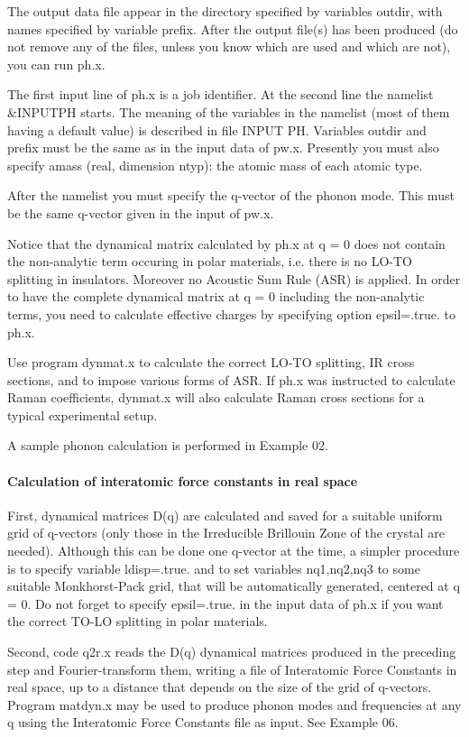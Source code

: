 \documentclass[12pt,a4paper]{article}
\begin{document}
The output data file appear in the directory specified by variables outdir,
with names specified by variable prefix. After the output file(s) has been
produced (do not remove any of the files, unless you know which are used
and which are not), you can run ph.x.
    
The first input line of ph.x is a job identifier. At the second line the
namelist \&INPUTPH starts. The meaning of the variables in the namelist
(most of them having a default value) is described in file INPUT PH. Variables
outdir and prefix must be the same as in the input data of pw.x. Presently
you must also specify amass (real, dimension ntyp): the atomic mass of each
atomic type.

After the namelist you must specify the q-vector of the phonon mode.
This must be the same q-vector given in the input of pw.x.
    
Notice that the dynamical matrix calculated by ph.x at q = 0 does not
contain the non-analytic term occuring in polar materials, i.e. there is no
LO-TO splitting in insulators. Moreover no Acoustic Sum Rule (ASR) is
applied. In order to have the complete dynamical matrix at q = 0 including
the non-analytic terms, you need to calculate effective charges by specifying
option epsil=.true. to ph.x.

Use program dynmat.x to calculate the correct LO-TO splitting, IR cross
sections, and to impose various forms of ASR. If ph.x was instructed to 
calculate Raman coefficients, dynmat.x will also calculate Raman cross sections
for a typical experimental setup.
    
A sample phonon calculation is performed in Example 02.

\paragraph{Calculation of interatomic force constants in real space}

First, dynamical matrices D(q) are calculated and saved for a suitable uniform 
grid of q-vectors (only those in the Irreducible Brillouin Zone of the
crystal are needed). Although this can be done one q-vector at the time, a
simpler procedure is to specify variable ldisp=.true. and to set variables
nq1,nq2,nq3 to some suitable Monkhorst-Pack grid, that will be automatically
generated, centered at q = 0. Do not forget to specify epsil=.true.
in the input data of ph.x if you want the correct TO-LO splitting in polar
materials.
    
Second, code q2r.x reads the D(q) dynamical matrices produced in the
preceding step and Fourier-transform them, writing a file of Interatomic Force
Constants in real space, up to a distance that depends on the size of the grid
of q-vectors. Program matdyn.x may be used to produce phonon modes and
frequencies at any q using the Interatomic Force Constants file as input.
See Example 06.
\end{document}
